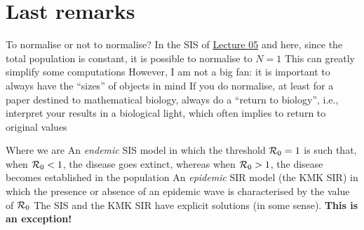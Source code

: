 \documentclass[aspectratio=43]{beamer}
\begin{document}
\section{Last remarks}

\begin{frame}{To normalise or not to normalise?}
  \bbullet In the SIS of \href{}{Lecture 05} and here, since the total population is constant, it is possible to normalise to $N=1$
  \vfill
  \bbullet This can greatly simplify some computations
  \vfill
  \bbullet However, I am not a big fan: it is important to always have the ``sizes'' of objects in mind
  \vfill
  \bbullet If you do normalise, at least for a paper destined to mathematical biology, always do a ``return to biology'', i.e., interpret your results in a biological light, which often implies to return to original values
  \end{frame}

\begin{frame}{Where we are}
  \bbullet An \emph{endemic} SIS model in which the threshold $\mathcal{R}_0=1$ is such that, when $\mathcal{R}_0<1$, the disease goes extinct, whereas when $\mathcal{R}_0>1$, the disease becomes established in the population
  \vfill
  \bbullet An \emph{epidemic} SIR model (the KMK SIR) in which the presence or absence of an epidemic wave is characterised by the value of $\mathcal{R}_0$
  \vfill
  \bbullet The SIS and the KMK SIR have explicit solutions (in some sense). \textbf{This is an exception!}
\end{frame}
\end{document}
